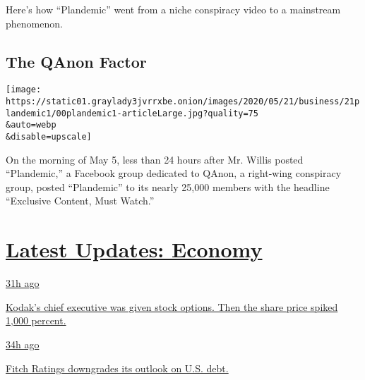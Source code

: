 Here's how ``Plandemic'' went from a niche conspiracy video to a
mainstream phenomenon.

\hypertarget{the-qanon-factor}{%
\subsection{The QAnon Factor}\label{the-qanon-factor}}

\texttt{[image: https://static01.graylady3jvrrxbe.onion/images/2020/05/21/business/21plandemic1/00plandemic1-articleLarge.jpg?quality=75\\\&auto=webp\\\&disable=upscale]}

On the morning of May 5, less than 24 hours after Mr. Willis posted
``Plandemic,'' a Facebook group dedicated to QAnon, a right-wing
conspiracy group, posted ``Plandemic'' to its nearly 25,000 members with
the headline ``Exclusive Content, Must Watch.''

\hypertarget{latest-updates-economy}{%
\section{\texorpdfstring{\href{https://www.nytimes3xbfgragh.onion/live/2020/07/31/business/stock-market-today-coronavirus?action=click\&pgtype=Article\&state=default\&region=MAIN_CONTENT_1\&context=storylines_live_updates}{Latest
Updates:
Economy}}{Latest Updates: Economy}}\label{latest-updates-economy}}

\href{https://www.nytimes3xbfgragh.onion/live/2020/07/31/business/stock-market-today-coronavirus?action=click\&pgtype=Article\&state=default\&region=MAIN_CONTENT_1\&context=storylines_live_updates\#kodaks-chief-executive-was-given-stock-options-then-the-share-price-spiked-1000-percent}{31h
ago}

\href{https://www.nytimes3xbfgragh.onion/live/2020/07/31/business/stock-market-today-coronavirus?action=click\&pgtype=Article\&state=default\&region=MAIN_CONTENT_1\&context=storylines_live_updates\#kodaks-chief-executive-was-given-stock-options-then-the-share-price-spiked-1000-percent}{Kodak's
chief executive was given stock options. Then the share price spiked
1,000 percent.}

\href{https://www.nytimes3xbfgragh.onion/live/2020/07/31/business/stock-market-today-coronavirus?action=click\&pgtype=Article\&state=default\&region=MAIN_CONTENT_1\&context=storylines_live_updates\#fitch-ratings-downgrades-its-outlook-on-us-debt}{34h
ago}

\href{https://www.nytimes3xbfgragh.onion/live/2020/07/31/business/stock-market-today-coronavirus?action=click\&pgtype=Article\&state=default\&region=MAIN_CONTENT_1\&context=storylines_live_updates\#fitch-ratings-downgrades-its-outlook-on-us-debt}{Fitch
Ratings downgrades its outlook on U.S. debt.}

